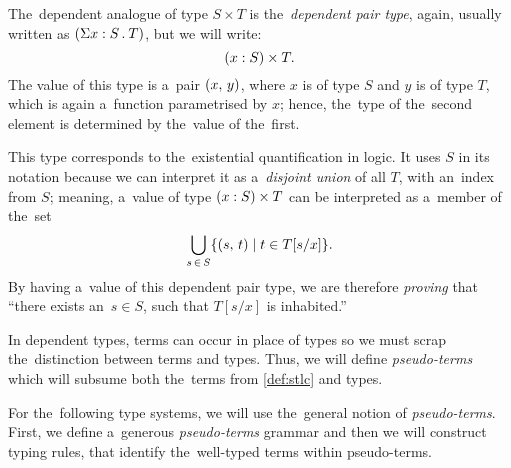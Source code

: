 The~dependent analogue of type $S \times T$ is the~\emph{dependent pair type},
again, usually written as ${(\Sigma x \overset{}: S \, . \: T)}$, but we will write:
\[
  (x \overset{}: S) \times T.
\]
The value of this type is a~pair $(x, \, y)$, where $x$ is of type $S$ and $y$
is of type $T$, which is again a~function parametrised by $x$; hence, the~type
of the~second element is determined by the~value of the~first.

This type corresponds to the~existential quantification in logic. It uses $S$ in
its notation because we can interpret it as a~\emph{disjoint union} of all $T$,
with an~index from $S$; meaning, a~value of type $(x \overset{}: S) \times T$ can be
interpreted as a~member of the~set
\[
  \bigcup_{s \, \in \, S} \{ (s, \, t) \mid t \in T[s/x] \}.
\]
By having a~value of this dependent pair type, we are therefore \emph{proving}
that ``there exists an~$s \in S$, such that $T[s/x]$ is inhabited.''

In dependent types, terms can occur in place of types so we must scrap
the~distinction between terms and types. Thus, we will define
\emph{pseudo-terms} which will subsume both the~terms from \autoref{def:stlc}
and types.


For the~following type systems, we will use the~general notion of
\emph{pseudo-terms}. First, we define a~generous \emph{pseudo-terms} grammar and
then we will construct typing rules, that identify the~well-typed terms within
pseudo-terms.

